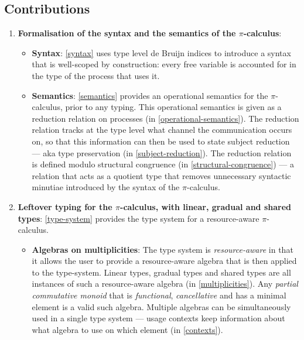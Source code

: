 \documentclass[a4paper,UKenglish,cleveref,autoref,thm-restate,authorcolumns]{lipics-v2019}
\theoremstyle{definition}
\newcommand{\picalc}{$\pi$-calculus}
\begin{document}
\subsection{Contributions}
\begin{enumerate}
\item \textbf{Formalisation of the syntax and the semantics of the \picalc{}}:
 \begin{itemize}
   \item \textbf{Syntax}: \autoref{syntax} uses type level de Bruijn indices \cite{deBruijn1972} to introduce a syntax that is well-scoped by construction: every free variable is accounted for in the type of the process that uses it.
   
   \item \textbf{Semantics}: \autoref{semantics} provides an operational semantics for the \picalc{}, prior to any typing.
   This operational semantics is given as a reduction relation on processes (in \autoref{operational-semantics}).
   The reduction relation tracks at the type level what channel the communication occurs on, so that this information can then be used to state subject reduction --- aka type preservation (in \autoref{subject-reduction}).
   The reduction relation is defined modulo structural congruence (in \autoref{structural-congruence}) --- a relation that acts as a quotient type that removes unnecessary syntactic minutiae introduced by the syntax of the \picalc{}.
 \end{itemize}
  
  \item \textbf{Leftover typing for the \picalc{}, with linear, gradual and shared types}:
  \autoref{type-system} provides the type system for a resource-aware \picalc{}.
  \begin{itemize}
    \item \textbf{Algebras on multiplicities}: The type system is \emph{resource-aware} in that it allows the user to provide a resource-aware algebra that is then applied to the type-system.
    Linear types, gradual types and shared types are all instances of such a resource-aware algebra (in \autoref{multiplicities}).
    Any \emph{partial commutative monoid} that is \emph{functional}, \emph{cancellative} and has a minimal element is a valid such algebra.
    Multiple algebras can be simultaneously used in a single type system --- usage contexts keep information about what algebra to use on which element (in \autoref{contexts}).


\end{itemize}
\end{enumerate}
\end{document}

